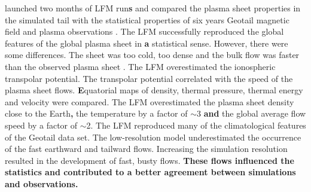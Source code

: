 \documentclass[linenumbers,draft]{agujournal}
\begin{document}
\citet{guild08:_geotail_lfm1,guild08:_geotail_lfm2} launched two months of LFM run\textbf{s} and compared the plasma sheet properties in the simulated tail with the statistical properties of six years Geotail magnetic field and plasma observations \citep{kokubun94:_geotail_magnet_field_exper,mukai94:_low_energ_partic_lep_exper_geotail_satel}. The LFM successfully reproduced the global features of the global plasma sheet in \textbf{a} statistical sense. However, there were some differences. The sheet was too cold, too dense and the bulk flow was faster than the observed plasma sheet \textbf{\citep{kokubun94:_geotail_magnet_field_exper,mukai94:_low_energ_partic_lep_exper_geotail_satel}}. The LFM overestimated the ionospheric transpolar potential. The transpolar potential correlated with the speed of the plasma sheet flows. \textbf{E}quatorial maps of density, thermal pressure, thermal energy and velocity were compared. The LFM overestimated the plasma sheet density close to the Earth\textbf{,} the temperature by a factor of $\sim$3 \textbf{and} the global average flow speed by a factor of $\sim$2. The LFM reproduced many of the climatological features of the Geotail data set. The low-resolution model underestimated the occurrence of the fast earthward and tailward flows. Increasing the simulation resolution resulted in the development of fast, busty flows. \textbf{These flows influenced the statistics and contributed to a better agreement between simulations and observations.}
\end{document}
